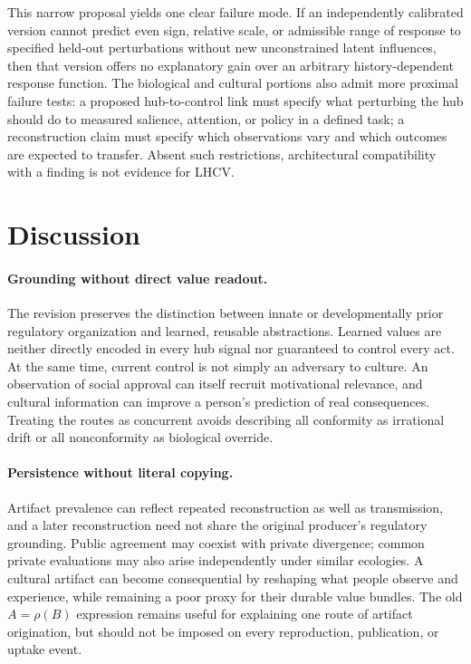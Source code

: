 \documentclass[11pt,a4paper]{article}
\begin{document}
This narrow proposal yields one clear failure mode. If an independently calibrated version cannot predict even sign, relative scale, or admissible range of response to specified held-out perturbations without new unconstrained latent influences, then that version offers no explanatory gain over an arbitrary history-dependent response function. The biological and cultural portions also admit more proximal failure tests: a proposed hub-to-control link must specify what perturbing the hub should do to measured salience, attention, or policy in a defined task; a reconstruction claim must specify which observations vary and which outcomes are expected to transfer. Absent such restrictions, architectural compatibility with a finding is not evidence for LHCV.

\section{Discussion}
\paragraph{Grounding without direct value readout.}
The revision preserves the distinction between innate or developmentally prior regulatory organization and learned, reusable abstractions. Learned values are neither directly encoded in every hub signal nor guaranteed to control every act. At the same time, current control is not simply an adversary to culture. An observation of social approval can itself recruit motivational relevance, and cultural information can improve a person's prediction of real consequences. Treating the routes as concurrent avoids describing all conformity as irrational drift or all nonconformity as biological override.

\paragraph{Persistence without literal copying.}
Artifact prevalence can reflect repeated reconstruction as well as transmission, and a later reconstruction need not share the original producer's regulatory grounding. Public agreement may coexist with private divergence; common private evaluations may also arise independently under similar ecologies. A cultural artifact can become consequential by reshaping what people observe and experience, while remaining a poor proxy for their durable value bundles. The old $A=\rho(B)$ expression remains useful for explaining one route of artifact origination, but should not be imposed on every reproduction, publication, or uptake event.
\end{document}
